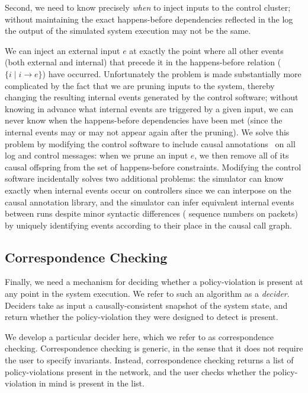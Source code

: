 Second, we need to know precisely {\em when} to inject inputs to the control
cluster; without maintaining the exact happens-before dependencies reflected in the
log the output of the simulated system execution may not be the same.

We can inject an external input $e$ at exactly the point where all other
events (both external and internal) that precede it in the happens-before
relation ($\{i \mid i \rightarrow e\}$) have occurred. Unfortunately the problem is made
substantially more complicated by the fact that we are pruning inputs to the
system, thereby changing the resulting internal events generated by the control
software; without knowing in advance what internal events are triggered by a
given input, we can never know when the happens-before dependencies have
been met (since the internal events may or may not appear again after the
pruning). We solve this problem by modifying the control software to include causal
annotations~\cite{xtrace} on all log and control messages:
when we prune an input $e$, we then remove all of its causal offspring from the set of
happens-before constraints. Modifying the control software incidentally solves two
additional problems: the simulator can know exactly when internal events occur
on controllers since we can interpose on the causal annotation library, and
the simulator can infer equivalent internal events between runs despite minor
syntactic differences (\eg{} sequence numbers on packets) by
uniquely identifying events according to their place in the causal call graph.


\subsection{Correspondence Checking}

Finally, we need a mechanism for deciding
whether a policy-violation is present at any point in the system execution.
We refer to such an algorithm as a {\em decider}. Deciders take as input a
causally-consistent snapshot of the system state, and return whether the
policy-violation they were designed to detect is present.

We develop a particular decider here, which we refer to as correspondence checking.
Correspondence checking is generic, in the sense that it does not require
the user to specify invariants. Instead, correspondence checking returns a list
of policy-violations present in the network, and the user checks whether the
policy-violation in mind is present in the list.

